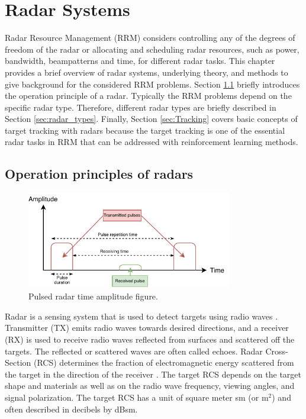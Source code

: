 \documentclass[english, 12pt, a4paper, elec, utf8, a-1b, online]{aaltothesis}
\numberwithin{equation}{section}
\begin{document}
\clearpage
\section{Radar Systems}\label{sec:background}

Radar Resource Management (RRM) considers controlling any of the degrees of freedom of the radar or allocating and scheduling radar resources, such as power, bandwidth, beampatterns and time, for different radar tasks.
This chapter provides a brief overview of radar systems, underlying theory, and methods to give background for the considered RRM problems.
Section \ref{sec:radar_opertaion_principle} briefly introduces the operation principle of a radar.
Typically the RRM problems depend on the specific radar type. 
Therefore, different radar types are briefly described in Section \ref{sec:radar_types}. 
Finally, Section \ref{sec:Tracking} covers basic concepts of target tracking with radars because the target tracking is one of the essential radar tasks in RRM that can be addressed with reinforcement learning methods.

\subsection{Operation principles of radars} \label{sec:radar_opertaion_principle}

\begin{figure}[htb]
    \centering
    \includegraphics[width=0.8\textwidth]{figures/background/pulsed_radar.pdf}
    \caption{Pulsed radar time amplitude figure.}
    \label{fig:pulsed_radar}
\end{figure}

Radar is a sensing system that is used to detect targets using radio waves \cite{Curry2011}.
Transmitter (TX) emits radio waves towards desired directions, and a receiver (RX) is used to receive radio waves reflected from surfaces and scattered off the targets. 
The reflected or scattered waves are often called echoes.
Radar Cross-Section (RCS) determines the fraction of electromagnetic energy scattered from the target in the direction of the receiver \cite{Curry2011}.
The target RCS depends on the target shape and materials as well as on the radio wave frequency, viewing angles, and signal polarization.
The target RCS has a unit of square meter sm (or m$^2$) and often described in decibels by dBsm.
\end{document}
